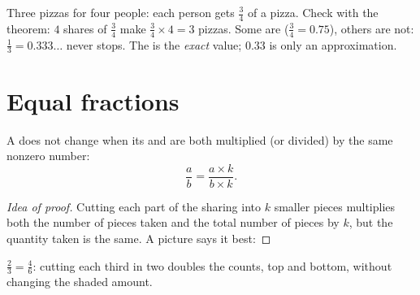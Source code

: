 \begin{example}\label{ex:g6:fractions:pizzas}
Three pizzas for four people: each person gets $\frac34$ of a pizza.
Check with the theorem: $4$ shares of $\frac34$ make
$\frac34 \times 4 = 3$ pizzas. Some  are 
($\frac34 = 0.75$), others are not: $\frac13 = 0.333\dots$ never stops.
The  is the \emph{exact} value; $0.33$ is only an approximation.
\end{example}

\section{Equal fractions}

\begin{proposition}\label{prop:g6:fractions:equal}
A  does not change when its  and  are both
multiplied (or divided) by the same nonzero number:
\[
\frac{a}{b} = \frac{a \times k}{b \times k} .
\]
\end{proposition}

\begin{proof}[Idea of proof]
Cutting each part of the sharing into $k$ smaller pieces multiplies both
the number of pieces taken and the total number of pieces by $k$, but
the quantity taken is the same. A picture says it best:
\end{proof}

\begin{omfigure}

{\small $\frac23 = \frac46$: cutting each third in two doubles the
counts, top and bottom, without changing the shaded amount.}
\end{omfigure}

